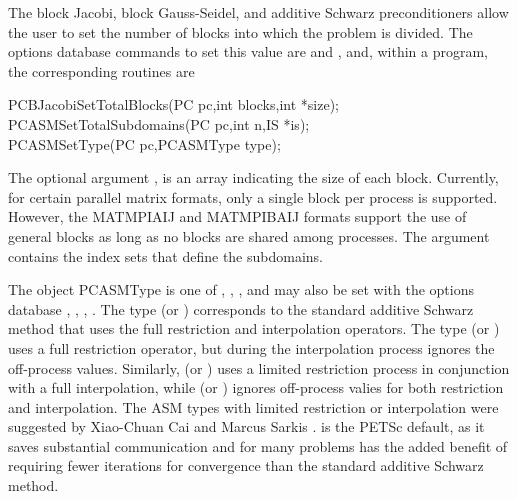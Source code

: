 The block Jacobi, block Gauss-Seidel, and additive Schwarz 
preconditioners allow the user
to set the number of blocks into which the problem is divided.  The
options database commands to set this value are  
and  , and, within a program, the corresponding routines
are  
  
\begin{tabbing}
  PCBJacobiSetTotalBlocks(PC pc,int blocks,int *size);\\
  PCASMSetTotalSubdomains(PC pc,int n,IS *is);\\
  PCASMSetType(PC pc,PCASMType type);
\end{tabbing}
The 
optional argument , is an array indicating the size of
each block. Currently, for certain parallel matrix formats, only a
single block per process is supported. However, the MATMPIAIJ and 
MATMPIBAIJ formats
support the use of general blocks as long as no blocks are shared
among processes. The  argument contains the index sets that
define the subdomains. 

The object PCASMType is one of ,
, , 
and may also be set with the options database 
 \trl{[basic}, , , \trl{none]}.
   
  
The type  (or  ) corresponds to the
standard additive Schwarz method that uses the full restriction and
interpolation operators.
The type  (or  ) uses a full
restriction operator, but during the interpolation process ignores the off-process
values.
Similarly,  (or  ) uses a limited
restriction process in conjunction with a full interpolation, while
 (or  ) ignores off-process valies
for both restriction and interpolation.
The ASM types with limited restriction or interpolation were suggested by 
Xiao-Chuan Cai and Marcus Sarkis \cite{cs97a}.    
 is the PETSc default, as it saves substantial communication
and for many problems has the added benefit of requiring fewer iterations for convergence
than the standard additive Schwarz method.

